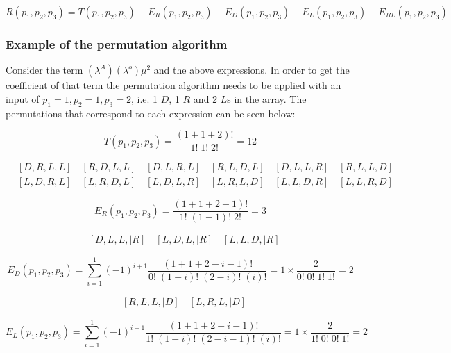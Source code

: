 \begin{equation*}
    R(p_1, p_2, p_3) = T(p_1, p_2, p_3) - E_R(p_1, p_2, p_3) - E_D(p_1, p_2, p_3) 
    - E_L(p_1, p_2, p_3) - E_{RL}(p_1, p_2, p_3)
\end{equation*}

\subsubsection{Example of the permutation algorithm}
Consider the term \((\lambda^A) (\lambda^o) \mu^2\) and the above expressions.
In order to get the coefficient of that term the permutation algorithm needs to 
be applied with an input of \(p_1=1, p_2=1, p_3=2\), i.e. 1 \(D\), 1 \(R\) and 2 
\(L\)s in the array.
The permutations that correspond to each expression can be seen below:

\begin{equation*}
    T(p_1, p_2, p_3) = \frac{(1+1+2)!}{1! \; 1! \; 2!} = 12
\end{equation*}

\begin{align*}
    & [D, R, L, L] \quad [R, D, L, L] \quad [D, L, R, L] \quad 
    [R, L, D, L] \quad [D, L, L, R] \quad [R, L, L, D] \\
    & [L, D, R, L] \quad [L, R, D, L] \quad [L, D, L, R] \quad 
    [L, R, L, D] \quad [L, L, D, R] \quad [L, L, R, D]
\end{align*}

\begin{equation*}
    E_R(p_1, p_2, p_3) = \frac{(1+1+2-1)!}{1! \; (1-1)! \; 2!} = 3
\end{equation*}

\begin{align*}
    & [D, L, L, | R] \quad [L, D, L, | R] \quad [L, L, D, | R]
\end{align*}


\begin{equation*}
    E_D(p_1, p_2, p_3) = \sum_{i=1}^{1} (-1)^{i+1} \frac{(1+1+2-i-1)!}{0! \; 
    (1-i)! \; (2-i)! \; (i)!} = 1 \times \frac{2}{0! \; 0! \; 1! \; 1!} = 2
\end{equation*}

\begin{align*}
    & [R, L, L, | D] \quad [L, R, L, | D] 
\end{align*}


\begin{equation*}
    E_L(p_1, p_2, p_3) = \sum_{i=1}^{1} (-1)^{i+1} 
    \frac{(1+1+2-i-1)!}{1! \; (1-i)! \; (2-i-1)! \; (i)!} 
    = 1 \times \frac{2}{1! \; 0! \; 0! \; 1!} = 2
\end{equation*}

